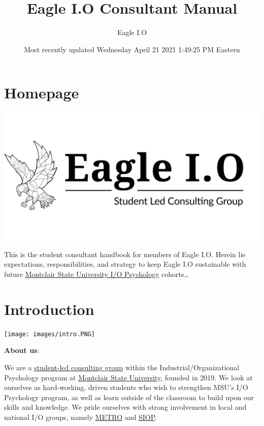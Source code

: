 \documentclass[
]{book}
\title{Eagle I.O Consultant Manual}
\author{Eagle I.O}
\date{Most recently updated Wednesday April 21 2021 1:49:25 PM Eastern}
\begin{document}
\maketitle

{
\setcounter{tocdepth}{4}
\tableofcontents
}
\hypertarget{homepage}{%
\chapter*{Homepage}\label{homepage}}

\includegraphics{images/eagleio dot.jpg}

This is the student consultant handbook for members of Eagle I.O. Herein lie expectations, responsibilities, and strategy to keep Eagle I.O sustainable with future \href{https://www.montclair.edu/psychology/graduate-programs/industrial-organizational-psychology/}{Montclair State University I/O Psychology} cohorts\ldots{}

\hypertarget{introduction}{%
\chapter{Introduction}\label{introduction}}

\texttt{[image: images/intro.PNG]}

\textbf{About us}:

We are a \href{https://eagle-io.weebly.com/}{student-led consulting group} within the Industrial/Organizational Psychology program at \href{https://www.montclair.edu/psychology/graduate-programs/industrial-organizational-psychology/}{Montclair State University}, founded in 2019. We look at ourselves as hard-working, driven students who wish to strengthen MSU's I/O Psychology program, as well as learn outside of the classroom to build upon our skills and knowledge. We pride ourselves with strong involvement in local and national I/O groups, namely \href{https://metroapppsych.com/}{METRO} and \href{https://siop.org}{SIOP}.
\end{document}
